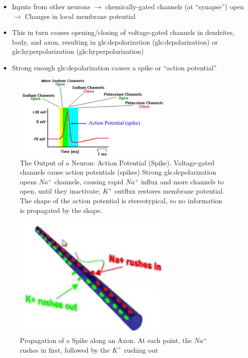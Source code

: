 \documentclass[]{article}
\begin{document}
\begin{itemize}
	\item Inputs from other neurons $\rightarrow$ 	chemically-gated channels (at
	``synapse'') open  $\rightarrow$ Changes in local membrane potential
	\item This in turn causes opening/closing 	of voltage-gated channels in 	dendrites, body, and axon, resulting in \gls{gls:depolarization} (\glsdesc{gls:depolarization}) or \gls{gls:hyperpolarization}	(\glsdesc{gls:hyperpolarization})
	\item Strong enough \gls{gls:depolarization}	causes a spike or “action potential”
\end{itemize}

\begin{figure}[H]
	\caption[The Output of a Neuron: Action Potential (Spike)]{The Output of a Neuron: Action Potential (Spike). Voltage-gated channels cause action potentials (spikes) Strong \gls{gls:depolarization} opens $Na^+$ channels, causing rapid $Na^+$ influx and more channels to open, until they inactivate; $K^+$ outflux restores membrane potential. The shape of the action potential is stereotypical, so no information is propagated by the shape.}
	\includegraphics[width=0.7\textwidth]{action-potential}
\end{figure}

\begin{figure}[H]
	\caption[Propagation of a Spike along an Axon]{Propagation of a Spike along an Axon. At each point, the $Na^+$ rushes in first, followed by the $K^+$ rushing out\cite{krantz2000PsychScholar}}
	\includegraphics[width=0.7\textwidth]{propagation1}
\end{figure}
\end{document}
